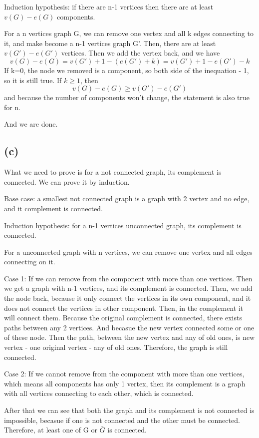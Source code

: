 \documentclass[11pt]{article}
\begin{document}
Induction hypothesis: if there are n-1 vertices then there are at least  \(v(G)-e(G)\) components.

For a n vertices graph G, we can remove one vertex and all k edges connecting to it, and make become a n-1 vertices graph G'. Then, there are at least  \(v(G')-e(G')\) vertices. Then we add the vertex back, and we have
$$v(G)-e(G)=v(G')+1-(e(G')+k)=v(G')+1-e(G')-k$$
If k=0, the node we removed is a component, so both side of the inequation - 1, so it is still true. If \(k\ge1\), then 
$$v(G)-e(G)\ge v(G')-e(G')$$
and because the number of components won't change, the statement is also true for n.

And we are done.
\subsection{(c)}
What we need to prove is for a not connected graph, its complement is connected. We can prove it by induction.

Base case: a smallest not connected graph is a graph with 2 vertex and no edge, and it complement is connected.

Induction hypothesis: for a n-1 vertices unconnected graph, its complement is connected.

For a unconnected graph with n vertices, we can remove one vertex and all edges connecting on it.

Case 1: If we can remove from the component with more than one vertices. Then we get a graph with n-1 vertices, and its complement is connected. Then, we add the node back, because it only connect the vertices in its own component, and it does not connect the vertices in other component. Then, in the complement it will connect them. Because the original complement is connected, there exists paths between any 2 vertices. And becasue the new vertex connected some or one of these node. Then the path, between the new vertex and any of old ones, is new vertex - one original vertex - any of old ones. Therefore, the graph is still connected.

Case 2: If we cannot remove from the component with more than one vertices, which means all components has only 1 vertex, then its complement is a graph with all vertices connecting to each other, which is connected.


After that we can see that both the graph and its complement is not connected is impossible, becasue if one is not connected and the other must be connected. Therefore, at least one of G or $\bar{G} $ is connected.
\end{document}
